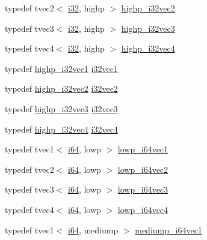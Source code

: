 \begin{DoxyCompactItemize}
\item 
typedef tvec2$<$ \hyperlink{group__gtc__type__precision_ga1d8ed5c43e91ea7d4528389da4fa9524}{i32}, highp $>$ \hyperlink{namespaceglm_a88f1af6328724a83287eb1fbc3471171}{highp\+\_\+i32vec2}
\item 
typedef tvec3$<$ \hyperlink{group__gtc__type__precision_ga1d8ed5c43e91ea7d4528389da4fa9524}{i32}, highp $>$ \hyperlink{namespaceglm_a83507b7234f4d89f6dbe83ec46c68c42}{highp\+\_\+i32vec3}
\item 
typedef tvec4$<$ \hyperlink{group__gtc__type__precision_ga1d8ed5c43e91ea7d4528389da4fa9524}{i32}, highp $>$ \hyperlink{namespaceglm_a09a96f2ad6c9c3ace7bfdbabed5d859f}{highp\+\_\+i32vec4}
\item 
typedef \hyperlink{namespaceglm_ad38568f19fc1dac06f1f3478689caf0e}{highp\+\_\+i32vec1} \hyperlink{group__gtc__type__precision_ga05a766bbe2ad0791ed0081baac492da7}{i32vec1}
\item 
typedef \hyperlink{namespaceglm_a88f1af6328724a83287eb1fbc3471171}{highp\+\_\+i32vec2} \hyperlink{group__gtc__type__precision_ga25820e641988fe33b075d80434872d02}{i32vec2}
\item 
typedef \hyperlink{namespaceglm_a83507b7234f4d89f6dbe83ec46c68c42}{highp\+\_\+i32vec3} \hyperlink{group__gtc__type__precision_gab67e08f6a4b1bce82a9a34ecb2bfba64}{i32vec3}
\item 
typedef \hyperlink{namespaceglm_a09a96f2ad6c9c3ace7bfdbabed5d859f}{highp\+\_\+i32vec4} \hyperlink{group__gtc__type__precision_ga3ada3676600db65a425058c0a150d83e}{i32vec4}
\item 
typedef tvec1$<$ \hyperlink{group__gtc__type__precision_gac7a7eaad46064fc952b06df33689da23}{i64}, lowp $>$ \hyperlink{namespaceglm_ab6d7801f963fafdce3a8096901e902ad}{lowp\+\_\+i64vec1}
\item 
typedef tvec2$<$ \hyperlink{group__gtc__type__precision_gac7a7eaad46064fc952b06df33689da23}{i64}, lowp $>$ \hyperlink{namespaceglm_ac8e2d710b3b859c4609821d77fd0d5e4}{lowp\+\_\+i64vec2}
\item 
typedef tvec3$<$ \hyperlink{group__gtc__type__precision_gac7a7eaad46064fc952b06df33689da23}{i64}, lowp $>$ \hyperlink{namespaceglm_aff7ecff167a372696b99f4a5de7f2712}{lowp\+\_\+i64vec3}
\item 
typedef tvec4$<$ \hyperlink{group__gtc__type__precision_gac7a7eaad46064fc952b06df33689da23}{i64}, lowp $>$ \hyperlink{namespaceglm_af879208ba37d0a2d2e6a43a138fb28cb}{lowp\+\_\+i64vec4}
\item 
typedef tvec1$<$ \hyperlink{group__gtc__type__precision_gac7a7eaad46064fc952b06df33689da23}{i64}, mediump $>$ \hyperlink{namespaceglm_aeca4a58c98c54100e8aa8c57ff05b149}{mediump\+\_\+i64vec1}

\end{DoxyCompactItemize}
